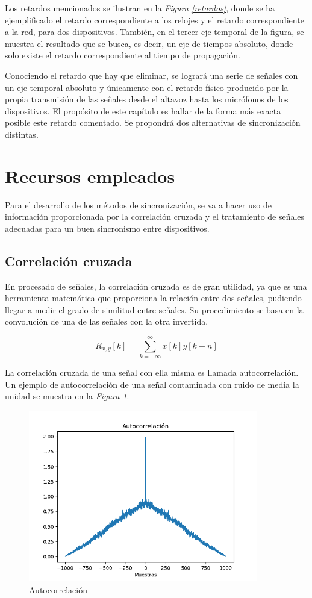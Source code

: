 \documentclass[a4paper,11pt]{book}
\begin{document}
Los retardos mencionados se ilustran en la \textit{Figura \ref{retardos}}, donde se ha ejemplificado el retardo correspondiente a los relojes y el retardo correspondiente a la red, para dos dispositivos. También, en el tercer eje temporal de la figura, se muestra el resultado que se busca, es decir, un eje de tiempos absoluto, donde solo existe el retardo correspondiente al tiempo de propagación.

Conociendo el retardo que hay que eliminar, se logrará una serie de señales con un eje temporal absoluto y únicamente con el retardo físico producido por la propia transmisión de las señales desde el altavoz hasta los micrófonos de los dispositivos. El propósito de este capítulo es hallar de la forma más exacta posible este retardo comentado. Se propondrá dos alternativas de sincronización distintas.

\section{Recursos empleados}
Para el desarrollo de los métodos de sincronización, se va a hacer uso de información proporcionada por la correlación cruzada y el tratamiento de señales adecuadas para un buen sincronismo entre dispositivos.

\subsection{Correlación cruzada}
En procesado de señales, la correlación cruzada es de gran utilidad, ya que es una herramienta matemática que proporciona la relación entre dos señales, pudiendo llegar a medir el grado de similitud entre señales. Su procedimiento se basa en la convolución de una de las señales con la otra invertida.

\begin{equation}
R_{x,y}[k] = \sum_{k = -\infty}^{\infty} x[k] y[k-n]
\end{equation}

La correlación cruzada de una señal con ella misma es llamada autocorrelación. Un ejemplo de autocorrelación de una señal contaminada con ruido de media la unidad se muestra en la \textit{Figura \ref{autoco}}.

\begin{figure}[hbtp]
 \centering
 \includegraphics[width = 10cm]{FIGURAS/autocorrelacion.png}
 \caption{Autocorrelación}
 \label{autoco}
 \end{figure}
\end{document}
